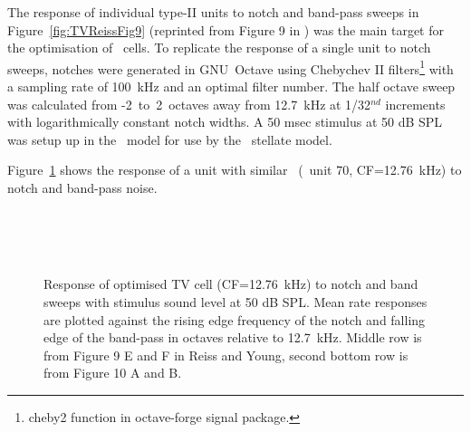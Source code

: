 The response of individual type-II units to notch and band-pass sweeps in
Figure~\ref{fig:TVReissFig9} (reprinted from Figure 9 in
\citep*{ReissYoung:2005}) was the main target for the optimisation of \TV~cells.
To replicate the response of a single unit to notch sweeps, notches were
generated in GNU~Octave using Chebychev II filters\footnote{\textsf{cheby2} function
  in octave-forge signal package.}  with a sampling rate of 100~kHz and an
optimal filter number.  The half octave sweep was calculated from
-2~to~2~octaves away from 12.7~kHz at 1/32$^{nd}$ increments with
logarithmically constant notch widths\footnotemark. A 50 msec stimulus at 50 dB
SPL was setup up in the \AN~model for use by the \CN~stellate model.



Figure~\ref{fig:TV_SweepUnit70} shows the response of a unit with similar
\CF~(\TV~unit 70, CF=12.76~kHz) to notch and band-pass noise.

\begin{figure}[htb]
  \centering
  \\
  \\
  \\
  \caption[Response of optimised TV cell (CF=12.76~kHz) to notch and band
  sweeps]{Response of optimised TV cell (CF=12.76~kHz) to notch and band sweeps
    with stimulus sound level at 50 dB SPL\@. Mean rate responses are plotted
    against the rising edge frequency of the notch and falling edge of the
    band-pass in octaves relative to 12.7~kHz. Middle row is from Figure 9 E and
    F in Reiss and Young, second bottom row is from Figure 10 A and B. }
  \label{fig:TV_SweepUnit70}
\end{figure}





